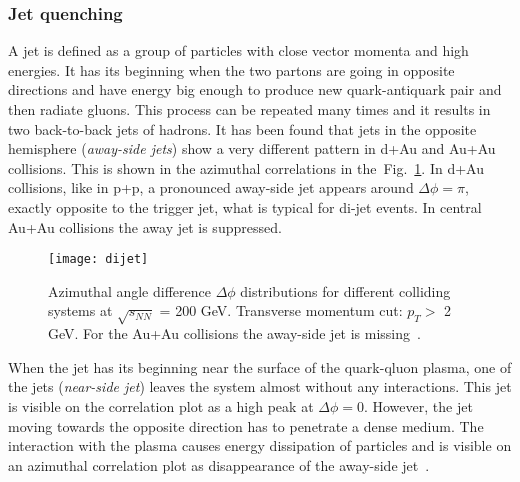       \subsubsection{Jet quenching}
        A jet is defined as a group of particles with close vector momenta and high energies.
        It has its beginning when the two partons are going in opposite directions and have energy big enough to produce new quark-antiquark pair and then radiate gluons.
        This process can be repeated many times and it results in two back-to-back jets of hadrons.
        It has been found that jets in the opposite hemisphere (\textit{away-side jets}) show a very different pattern in d+Au and Au+Au collisions.
        This is shown in the azimuthal correlations in the~Fig.~\ref{fig:di-jet}.
        In d+Au collisions, like in p+p, a pronounced away-side jet appears around $\Delta \phi = \pi$, exactly opposite to the trigger jet, what is typical for di-jet events.
        In central Au+Au collisions the away jet is suppressed. 
        \begin{figure}[h]
          \centering
          \texttt{[image: dijet]}
          \caption{Azimuthal angle difference $\Delta \phi$ distributions for different colliding systems at $\sqrt{s_{NN}}$ = 200 GeV. Transverse momentum cut: $p_T >$ 2 GeV. For the Au+Au collisions the away-side jet is missing~\cite{rhic_jets}.}
          \label{fig:di-jet}
        \end{figure}
        When the jet has its beginning near the surface of the quark-qluon plasma, one of the jets (\textit{near-side jet}) leaves the system almost without any interactions.
        This jet is visible on the correlation plot as a high peak at $\Delta \phi = 0$.
        However, the jet moving towards the opposite direction has to penetrate a dense medium.
        The interaction with the plasma causes energy dissipation of particles and is visible on an azimuthal correlation plot as disappearance of the away-side jet~\cite{bartke}.

